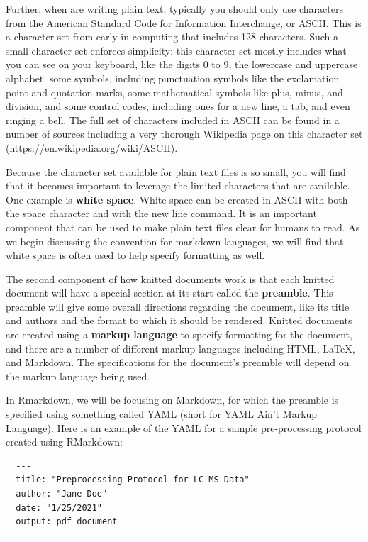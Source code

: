\documentclass[]{tufte-book}
\begin{document}
Further, when are writing plain text, typically you should only use characters
from the American Standard Code for Information Interchange, or ASCII. This is a
character set from early in computing that includes 128 characters. Such a small
character set enforces simplicity: this character set mostly includes what you
can see on your keyboard, like the digits 0 to 9, the lowercase and uppercase
alphabet, some symbols, including punctuation symbols like the exclamation point
and quotation marks, some mathematical symbols like plus, minus, and division,
and some control codes, including ones for a new line, a tab, and even ringing a
bell. The full set of characters included in ASCII can be found in a number of
sources including a very thorough Wikipedia page on this character set (\url{https://en.wikipedia.org/wiki/ASCII}).

Because the character set available for plain text files is so small, you will
find that it becomes important to leverage the limited characters that are
available. One example is \textbf{white space}. White space can be created in ASCII
with both the space character and with the new line command. It is an important
component that can be used to make plain text files clear for humans to read. As
we begin discussing the convention for markdown languages, we will find that
white space is often used to help specify formatting as well.

The second component of how knitted documents work is that each knitted document
will have a special section at its start called the \textbf{preamble}. This preamble
will give some overall directions regarding the document, like its title and
authors and the format to which it should be rendered. Knitted documents are
created using a \textbf{markup language} to specify formatting for the document, and
there are a number of different markup languages including HTML, LaTeX, and
Markdown. The specifications for the document's preamble will depend on the
markup language being used.

In Rmarkdown, we will be focusing on Markdown, for which the preamble is
specified using something called YAML (short for YAML Ain't Markup Language).
Here is an example of the YAML for a sample pre-processing protocol created
using RMarkdown:

\begin{verbatim}
  ---
  title: "Preprocessing Protocol for LC-MS Data"
  author: "Jane Doe"
  date: "1/25/2021"
  output: pdf_document
  ---
\end{verbatim}
\end{document}
